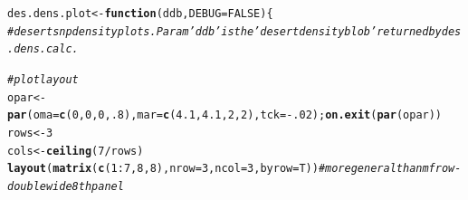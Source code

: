 \documentclass{article}\usepackage[]{graphicx}\usepackage[]{color}
\makeatletter
\newcommand{\hlnum}[1]{\textcolor[rgb]{0.686,0.059,0.569}{#1}}%
\newcommand{\hlcom}[1]{\textcolor[rgb]{0.678,0.584,0.686}{\textit{#1}}}%
\newcommand{\hlopt}[1]{\textcolor[rgb]{0,0,0}{#1}}%
\newcommand{\hlstd}[1]{\textcolor[rgb]{0.345,0.345,0.345}{#1}}%
\newcommand{\hlkwa}[1]{\textcolor[rgb]{0.161,0.373,0.58}{\textbf{#1}}}%
\newcommand{\hlkwb}[1]{\textcolor[rgb]{0.69,0.353,0.396}{#1}}%
\newcommand{\hlkwc}[1]{\textcolor[rgb]{0.333,0.667,0.333}{#1}}%
\newcommand{\hlkwd}[1]{\textcolor[rgb]{0.737,0.353,0.396}{\textbf{#1}}}%
\newenvironment{kframe}{%
 \def\at@end@of@kframe{}%
 \ifinner\ifhmode%
  \def\at@end@of@kframe{\end{minipage}}%
  \begin{minipage}{\columnwidth}%
 \fi\fi%
 \def\FrameCommand##1{\hskip\@totalleftmargin \hskip-\fboxsep
 \colorbox{shadecolor}{##1}\hskip-\fboxsep
     \hskip-\linewidth \hskip-\@totalleftmargin \hskip\columnwidth}%
 \MakeFramed {\advance\hsize-\width
   \@totalleftmargin\z@ \linewidth\hsize
   \@setminipage}}%
 {\par\unskip\endMakeFramed%
 \at@end@of@kframe}
\newenvironment{knitrout}{}{} %
\makeatother
\begin{document}
\begin{knitrout}\footnotesize
{}\color{fgcolor}\begin{kframe}
\begin{alltt}
\hlstd{des.dens.plot} \hlkwb{<-} \hlkwa{function}\hlstd{(}\hlkwc{ddb}\hlstd{,} \hlkwc{DEBUG}\hlstd{=}\hlnum{FALSE}\hlstd{)\{}
  \hlcom{# desert snp density plots.  Param 'ddb' is the 'desert density blob' returned by des.dens.calc.}

  \hlcom{# plot layout}
  \hlstd{opar} \hlkwb{<-} \hlkwd{par}\hlstd{(}\hlkwc{oma}\hlstd{=}\hlkwd{c}\hlstd{(}\hlnum{0}\hlstd{,}\hlnum{0}\hlstd{,}\hlnum{0}\hlstd{,}\hlnum{.8}\hlstd{),}\hlkwc{mar}\hlstd{=}\hlkwd{c}\hlstd{(}\hlnum{4.1}\hlstd{,}\hlnum{4.1}\hlstd{,}\hlnum{2}\hlstd{,}\hlnum{2}\hlstd{),}\hlkwc{tck}\hlstd{=}\hlopt{-}\hlnum{.02}\hlstd{);} \hlkwd{on.exit}\hlstd{(}\hlkwd{par}\hlstd{(opar))}
  \hlstd{rows} \hlkwb{<-} \hlnum{3}
  \hlstd{cols} \hlkwb{<-} \hlkwd{ceiling}\hlstd{(}\hlnum{7}\hlopt{/}\hlstd{rows)}
  \hlkwd{layout}\hlstd{(}\hlkwd{matrix}\hlstd{(}\hlkwd{c}\hlstd{(}\hlnum{1}\hlopt{:}\hlnum{7}\hlstd{,}\hlnum{8}\hlstd{,}\hlnum{8}\hlstd{),}\hlkwc{nrow}\hlstd{=}\hlnum{3}\hlstd{,}\hlkwc{ncol}\hlstd{=}\hlnum{3}\hlstd{,}\hlkwc{byrow}\hlstd{=T))} \hlcom{# more general than mfrow - doublewide 8th panel}


\end{alltt}
\end{kframe}
\end{knitrout}
\end{document}
